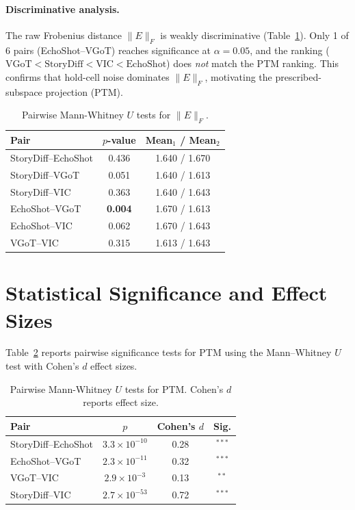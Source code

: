 \documentclass[sigconf,review,anonymous]{acmart}
\begin{document}
\paragraph{Discriminative analysis.}
The raw Frobenius distance $\|E\|_F$ is weakly discriminative (Table~\ref{tab:frobenius}). Only 1 of 6 pairs (EchoShot--VGoT) reaches significance at $\alpha = 0.05$, and the ranking ($\text{VGoT} < \text{StoryDiff} < \text{VIC} < \text{EchoShot}$) does \emph{not} match the PTM ranking.
This confirms that hold-cell noise dominates $\|E\|_F$, motivating the prescribed-subspace projection (PTM).
\begin{table}[H]
\caption{Pairwise Mann-Whitney $U$ tests for $\|E\|_F$.}
\label{tab:frobenius}
\centering
\small
\begin{tabular}{@{}lcc@{}}
\toprule
Pair & $p$-value & Mean$_1$ / Mean$_2$ \\
\midrule
StoryDiff--EchoShot    & 0.436 & 1.640 / 1.670 \\
StoryDiff--VGoT    & 0.051 & 1.640 / 1.613 \\
StoryDiff--VIC     & 0.363 & 1.640 / 1.643 \\
EchoShot--VGoT  & \textbf{0.004} & 1.670 / 1.613 \\
EchoShot--VIC   & 0.062 & 1.670 / 1.643 \\
VGoT--VIC   & 0.315 & 1.613 / 1.643 \\
\bottomrule
\end{tabular}
\end{table}


\section{Statistical Significance and Effect Sizes}
\label{app:significance}

Table~\ref{tab:mann_whitney} reports pairwise significance tests for PTM using the Mann--Whitney $U$ test with Cohen's $d$ effect sizes.
\begin{table}[H]
\caption{Pairwise Mann-Whitney $U$ tests for PTM. Cohen's $d$ reports effect size.}
\label{tab:mann_whitney}
\centering
\small
\setlength{\tabcolsep}{2.5pt}
\begin{tabular}{@{}lccc@{}}
\toprule
Pair & $p$ & Cohen's $d$ & Sig. \\
\midrule
StoryDiff--EchoShot    & $3.3 \times 10^{-10}$ & 0.28 & $^{***}$ \\
EchoShot--VGoT  & $2.3 \times 10^{-11}$ & 0.32 & $^{***}$ \\
VGoT--VIC   & $2.9 \times 10^{-3}$  & 0.13 & $^{**}$  \\
StoryDiff--VIC     & $2.7 \times 10^{-53}$ & 0.72 & $^{***}$ \\
\bottomrule
\end{tabular}
\end{table}
\end{document}
